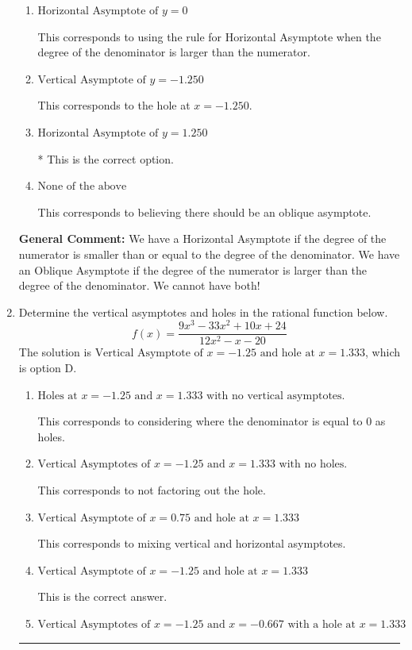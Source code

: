 \documentclass{extbook}[14pt]
\newcommand{\litem}[1]{\item #1

\rule{\textwidth}{0.4pt}}
\begin{document}
\begin{enumerate}
{\begin{enumerate}[label=\Alph*.]
This corresponds to the hole at $x = 4$.
\item \( \text{Horizontal Asymptote of } y = 0  \)

This corresponds to using the rule for Horizontal Asymptote when the degree of the denominator is larger than the numerator.
\item \( \text{Vertical Asymptote of } y = -1.250  \)

This corresponds to the hole at $x = -1.250$.
\item \( \text{Horizontal Asymptote of } y = 1.250  \)

* This is the correct option.
\item \( \text{None of the above} \)

This corresponds to believing there should be an oblique asymptote.
\end{enumerate}

\textbf{General Comment:} We have a Horizontal Asymptote if the degree of the numerator is smaller than or equal to the degree of the denominator. We have an Oblique Asymptote if the degree of the numerator is larger than the degree of the denominator. We cannot have both!
}
\litem{
Determine the vertical asymptotes and holes in the rational function below.
\[ f(x) = \frac{9x^{3} -33 x^{2} +10 x + 24}{12x^{2} -x -20} \]The solution is \( \text{Vertical Asymptote of } x = -1.25 \text{ and hole at } x = 1.333 \), which is option D.\begin{enumerate}[label=\Alph*.]
\item \( \text{Holes at } x = -1.25 \text{ and } x = 1.333 \text{ with no vertical asymptotes.} \)

This corresponds to considering where the denominator is equal to 0 as holes.
\item \( \text{Vertical Asymptotes of } x = -1.25 \text{ and } x = 1.333 \text{ with no holes.} \)

This corresponds to not factoring out the hole.
\item \( \text{Vertical Asymptote of } x = 0.75 \text{ and hole at } x = 1.333 \)

This corresponds to mixing vertical and horizontal asymptotes.
\item \( \text{Vertical Asymptote of } x = -1.25 \text{ and hole at } x = 1.333 \)

This is the correct answer.
\item \( \text{Vertical Asymptotes of } x = -1.25 \text{ and } x = -0.667 \text{ with a hole at } x = 1.333 \)


\end{enumerate}}
\end{enumerate}
\end{document}
